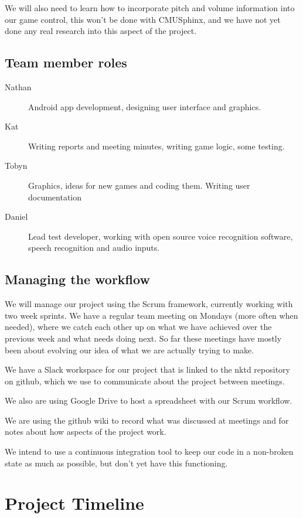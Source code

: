 \documentclass[11pt, oneside]{article}
\begin{document}
We will also need to learn how to incorporate pitch and volume
information into our game control, this won't be done with CMUSphinx,
and we have not yet done any real research into this aspect of the
project.


\subsection*{Team member roles}

\begin{description}
\item [Nathan] Android app development, designing user interface and
  graphics.
\item [Kat] Writing reports and meeting minutes, writing game logic,
  some testing.
\item [Tobyn] Graphics, ideas for new games and coding them. Writing
  user documentation
\item [Daniel] Lead test developer, working with open source voice
  recognition software, speech recognition and audio inputs.
\end{description}


\subsection*{Managing the workflow}

We will manage our project using the Scrum framework, currently
working with two week sprints. We have a regular team meeting on
Mondays (more often when needed), where we catch each other up on what
we have achieved over the previous week and what needs doing next. So
far these meetings have mostly been about evolving our idea of what we
are actually trying to make.

We have a Slack workspace for our project that is linked to the nktd
repository on github, which we use to communicate about the project
between meetings.

We also are using Google Drive to host a spreadsheet with our Scrum
workflow.

We are using the github wiki to record what was discussed at meetings
and for notes about how aspects of the project work.

We intend to use a continuous integration tool to keep our code in a non-broken 
state as much as possible, but don't yet have this functioning.

\section*{Project Timeline}
\end{document}
